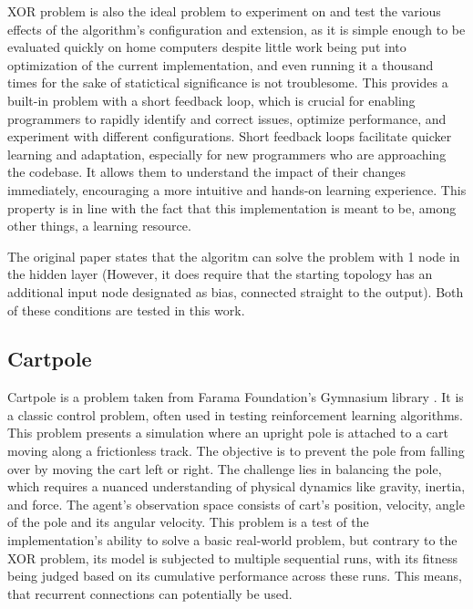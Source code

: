 \documentclass{article}
\begin{document}
        \par XOR problem is also the ideal problem to experiment on and test the various effects of the algorithm's configuration and extension,
        as it is simple enough to be evaluated quickly on home computers despite little work being put into optimization of the
        current implementation,
        and even running it a thousand times for the sake of statictical significance is not troublesome.
        This provides a built-in problem with a short feedback loop, which is crucial for 
        enabling programmers to rapidly identify and correct issues, optimize performance, and experiment with different configurations.
        Short feedback loops facilitate quicker learning and adaptation, especially for new programmers who are approaching the codebase.
        It allows them to understand the impact of their changes immediately, encouraging a more intuitive and hands-on learning experience.
        This property is in line with the fact that this implementation is meant to be, among other things, a learning resource.

        The original paper \cite{originalNeat}
        states that the algoritm can solve the problem with 1 node in the hidden layer (However,
        it does require that the starting topology has an additional input node designated
        as bias, connected straight to the output). Both of these conditions are tested in this work.

        \subsection{Cartpole}
        Cartpole is a problem taken from Farama Foundation's Gymnasium library \cite{gymnasium}. It is a classic control problem,
        often used in testing reinforcement learning algorithms.
        This problem presents a simulation where an upright pole is attached to a cart moving along a frictionless track.
        The objective is to prevent the pole from falling over by moving the cart left or right.
        The challenge lies in balancing the pole,
        which requires a nuanced understanding of physical dynamics like gravity, inertia, and force.
        The agent's observation space consists of cart's 
        position, velocity, angle of the pole and its angular velocity.
        This problem is a test of the implementation's ability to solve a basic real-world problem, but contrary 
        to the XOR problem, its model is subjected to multiple sequential runs,
        with its fitness being judged based on its cumulative performance across these runs. This means, that
        recurrent connections can potentially be used.
\end{document}
